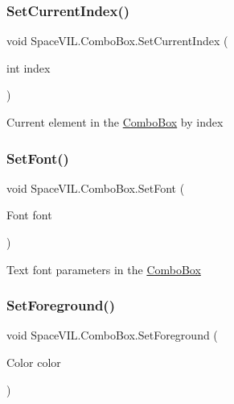 \subsubsection{\texorpdfstring{Set\+Current\+Index()}{SetCurrentIndex()}}
{\footnotesize\ttfamily void Space\+V\+I\+L.\+Combo\+Box.\+Set\+Current\+Index (\begin{DoxyParamCaption}\item[{int}]{index }\end{DoxyParamCaption})\hspace{0.3cm}{\ttfamily [inline]}}



Current element in the \mbox{\hyperlink{class_space_v_i_l_1_1_combo_box}{Combo\+Box}} by index 

\mbox{\label{class_space_v_i_l_1_1_combo_box_a6054da3f7eb5440ba249ab2d15128dc9}} 
\subsubsection{\texorpdfstring{Set\+Font()}{SetFont()}}
{\footnotesize\ttfamily void Space\+V\+I\+L.\+Combo\+Box.\+Set\+Font (\begin{DoxyParamCaption}\item[{Font}]{font }\end{DoxyParamCaption})\hspace{0.3cm}{\ttfamily [inline]}}



Text font parameters in the \mbox{\hyperlink{class_space_v_i_l_1_1_combo_box}{Combo\+Box}} 

\mbox{\label{class_space_v_i_l_1_1_combo_box_a968e19273a68fd5655ddead9149ad72c}} 
\subsubsection{\texorpdfstring{Set\+Foreground()}{SetForeground()}}
{\footnotesize\ttfamily void Space\+V\+I\+L.\+Combo\+Box.\+Set\+Foreground (\begin{DoxyParamCaption}\item[{Color}]{color }\end{DoxyParamCaption})\hspace{0.3cm}{\ttfamily [inline]}}



